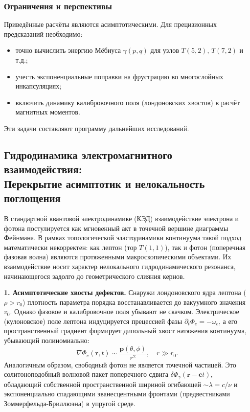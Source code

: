 \documentclass[11pt,a4paper]{article}
\begin{document}
\subsubsection{Ограничения и перспективы}
Приведённые расчёты являются асимптотическими. Для прецизионных предсказаний необходимо:
\begin{itemize}
\item точно вычислить энергию Мёбиуса $\gamma(p,q)$ для узлов $T(5,2)$, $T(7,2)$ и т.д.;
\item учесть экспоненциальные поправки на фрустрацию во многослойных инкапсуляциях;
\item включить динамику калибровочного поля (лондоновских хвостов) в расчёт магнитных моментов.
\end{itemize}
Эти задачи составляют программу дальнейших исследований.
	
	\subsection{Гидродинамика электромагнитного взаимодействия:\\ Перекрытие асимптотик и нелокальность поглощения}
	
	В стандартной квантовой электродинамике (КЭД) взаимодействие электрона и фотона постулируется как мгновенный акт в точечной вершине диаграммы Фейнмана. В рамках топологической эластодинамики континуума такой подход математически некорректен: как лептон (тор $T(1,1)$), так и фотон (поперечная фазовая волна) являются протяженными макроскопическими объектами. Их взаимодействие носит характер нелокального гидродинамического резонанса, начинающегося задолго до геометрического слияния кернов.
	
	\textbf{1. Асимптотические хвосты дефектов.}
	Снаружи лондоновского ядра лептона ($\rho > r_0$) плотность параметра порядка восстанавливается до вакуумного значения $v_0$. Однако фазовое и калибровочное поля убывают не скачком. Электрическое (кулоновское) поле лептона индуцируется прецессией фазы $\partial_t \Phi_e = -\omega_e$, а его пространственный градиент формирует дипольный хвост натяжения континуума, убывающий полиномиально:
	\begin{equation}
		\nabla \Phi_e(\mathbf{r}, t) \sim \frac{\mathbf{p}(\theta, \phi)}{r^2}, \quad r \gg r_0.
	\end{equation}
	Аналогичным образом, свободный фотон не является точечной частицей. Это солитоноподобный волновой пакет поперечного сдвига $\delta \Phi_\gamma(\mathbf{r}-\mathbf{c}t)$, обладающий собственной пространственной шириной огибающей $\sim \lambda = c/\nu$ и экспоненциально спадающими эванесцентными фронтами (предвестниками Зоммерфельда-Бриллюэна) в упругой среде.
	
\end{document}
